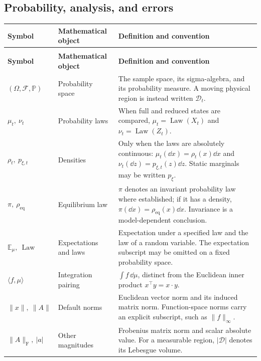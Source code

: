 \subsection*{Probability, analysis, and errors}
\begingroup
\small
{}
\setlength{\tabcolsep}{4pt}
\renewcommand{\arraystretch}{1.16}
\begin{longtable}{@{}>{\raggedright\arraybackslash}p{32mm}>{\raggedright\arraybackslash}p{26mm}>{\raggedright\arraybackslash}p{90mm}@{}}
\toprule
\textbf{Symbol} & \textbf{Mathematical object} & \textbf{Definition and convention}\\
\midrule
\endfirsthead
\multicolumn{3}{@{}l}{\small\itshape Probability, analysis, and errors (continued)}\\[3pt]
\toprule
\textbf{Symbol} & \textbf{Mathematical object} & \textbf{Definition and convention}\\
\midrule
\endhead
\bottomrule
\endfoot
$(\Omega,\mathcal F,\mathbb P)$ & Probability space & The sample space, its sigma-algebra, and its probability measure. A moving physical region is instead written $\mathcal D_t$.\\[3pt]
$\mu_t,\ \nu_t$ & Probability laws & When full and reduced states are compared, $\mu_t=\operatorname{Law}(X_t)$ and $\nu_t=\operatorname{Law}(Z_t)$.\\[3pt]
$\rho_t,\ p_{\xi,t}$ & Densities & Only when the laws are absolutely continuous: $\mu_t(\dd x)=\rho_t(x)\dd x$ and $\nu_t(\dd z)=p_{\xi,t}(z)\dd z$. Static marginals may be written $p_\xi$.\\[3pt]
$\pi,\ \rho_{\mathrm{eq}}$ & Equilibrium law & $\pi$ denotes an invariant probability law where established; if it has a density, $\pi(\dd x)=\rho_{\mathrm{eq}}(x)\dd x$. Invariance is a model-dependent conclusion.\\[3pt]
$\mathbb E_\mu,\ \operatorname{Law}$ & Expectations and laws & Expectation under a specified law and the law of a random variable. The expectation subscript may be omitted on a fixed probability space.\\[3pt]
$\langle f,\mu\rangle$ & Integration pairing & $\int f\,\dd\mu$, distinct from the Euclidean inner product $x^\top y=x\cdot y$.\\[3pt]
$\|x\|,\ \|A\|$ & Default norms & Euclidean vector norm and its induced matrix norm. Function-space norms carry an explicit subscript, such as $\|f\|_\infty$.\\[3pt]
$\|A\|_{\mathrm F},\ |a|$ & Other magnitudes & Frobenius matrix norm and scalar absolute value. For a measurable region, $|\mathcal D|$ denotes its Lebesgue volume.\\[3pt]

\end{longtable}
